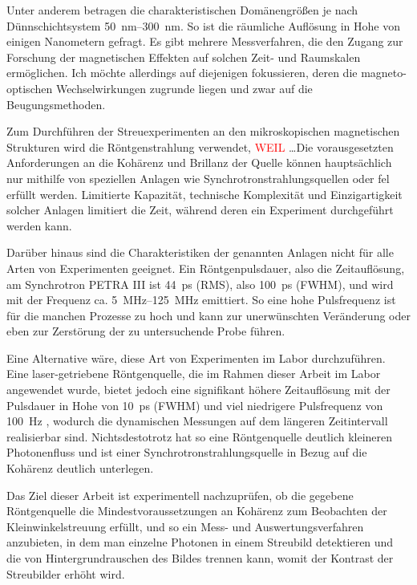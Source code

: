 \noindent
Unter anderem betragen die charakteristischen Domänengrößen je nach Dünnschichtsystem \SIrange[range-units = single]{50}{300}{\nano\meter}. So ist die räumliche Auflösung in Hohe von einigen Nanometern gefragt. Es gibt mehrere Messverfahren, die den Zugang zur Forschung der magnetischen Effekten auf solchen Zeit- und Raumskalen ermöglichen. Ich möchte allerdings auf diejenigen fokussieren, deren die magneto-optischen Wechselwirkungen zugrunde liegen und zwar auf die Beugungsmethoden.

\noindent
Zum Durchführen der Streuexperimenten an den mikroskopischen magnetischen Strukturen wird die Röntgenstrahlung verwendet, \textcolor{red}{WEIL} \dots  Die vorausgesetzten Anforderungen an die Kohärenz und Brillanz der Quelle können hauptsächlich nur mithilfe von speziellen Anlagen wie Synchrotronstrahlungsquellen oder \gls{fel} erfüllt werden. Limitierte Kapazität, technische Komplexität und Einzigartigkeit solcher Anlagen limitiert die Zeit, während deren ein Experiment durchgeführt werden kann. %

\noindent
Darüber hinaus sind die Charakteristiken der genannten Anlagen nicht für alle Arten von Experimenten geeignet. Ein Röntgenpulsdauer, also die Zeitauflösung, am Synchrotron PETRA III ist \SI{44}{\pico\second} (RMS), also \SI{100}{\pico\second} (FWHM), und wird mit der Frequenz ca. \SIrange[range-units = single]{5}{125}{\mega\hertz} \cite{noauthor_machine_nodate} emittiert. So eine hohe Pulsfrequenz ist für die manchen Prozesse zu hoch und kann zur unerwünschten Veränderung oder eben zur Zerstörung der zu untersuchende Probe führen.

\noindent
Eine Alternative wäre, diese Art von Experimenten im Labor durchzuführen. Eine laser-getriebene Röntgenquelle, die im Rahmen dieser Arbeit im Labor angewendet wurde, bietet jedoch eine signifikant höhere Zeitauflösung mit der Pulsdauer in Hohe von \SI{10}{\pico\second} (FWHM) und viel niedrigere Pulsfrequenz von \SI{100}{\hertz} \cite{schick_laser-driven_2021}, wodurch die dynamischen Messungen auf dem längeren Zeitintervall realisierbar sind. Nichtsdestotrotz hat so eine Röntgenquelle deutlich kleineren Photonenfluss und ist einer Synchrotronstrahlungsquelle in Bezug auf die Kohärenz deutlich unterlegen.  

\noindent
Das Ziel dieser Arbeit ist experimentell nachzuprüfen, ob die gegebene Röntgenquelle die Mindestvoraussetzungen an Kohärenz zum Beobachten der Kleinwinkelstreuung erfüllt, und so ein Mess- und Auswertungsverfahren anzubieten, in dem man einzelne Photonen in einem Streubild detektieren und die von Hintergrundrauschen des Bildes trennen kann, womit der Kontrast der Streubilder erhöht wird.

